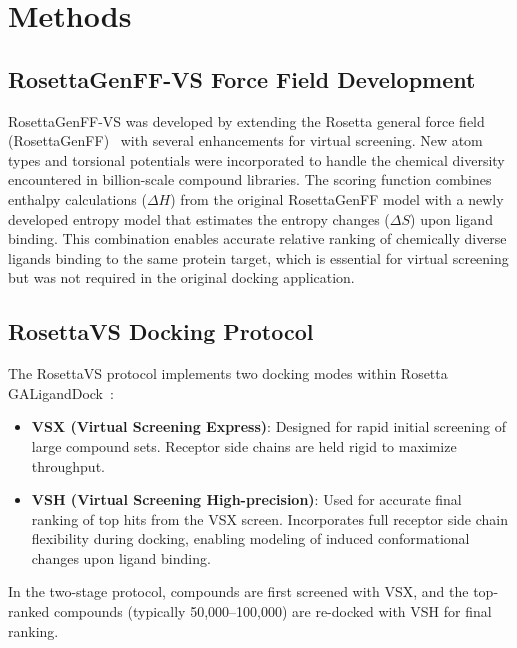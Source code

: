 \documentclass[11pt]{article}
\begin{document}
\section{Methods}

\subsection{RosettaGenFF-VS Force Field Development}

RosettaGenFF-VS was developed by extending the Rosetta general force field (RosettaGenFF)~\citep{park2021force} with several enhancements for virtual screening. New atom types and torsional potentials were incorporated to handle the chemical diversity encountered in billion-scale compound libraries. The scoring function combines enthalpy calculations ($\Delta H$) from the original RosettaGenFF model with a newly developed entropy model that estimates the entropy changes ($\Delta S$) upon ligand binding. This combination enables accurate relative ranking of chemically diverse ligands binding to the same protein target, which is essential for virtual screening but was not required in the original docking application.

\subsection{RosettaVS Docking Protocol}

The RosettaVS protocol implements two docking modes within Rosetta GALigandDock~\citep{park2021force}:

\begin{itemize}
    \item \textbf{VSX (Virtual Screening Express)}: Designed for rapid initial screening of large compound sets. Receptor side chains are held rigid to maximize throughput.
    \item \textbf{VSH (Virtual Screening High-precision)}: Used for accurate final ranking of top hits from the VSX screen. Incorporates full receptor side chain flexibility during docking, enabling modeling of induced conformational changes upon ligand binding.
\end{itemize}

In the two-stage protocol, compounds are first screened with VSX, and the top-ranked compounds (typically 50,000--100,000) are re-docked with VSH for final ranking.
\end{document}
